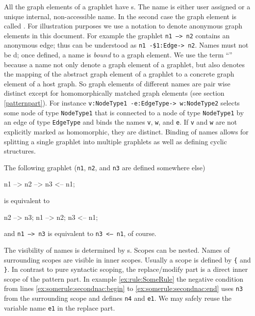 All the graph elements of a graphlet have s.
The name is either user assigned or a unique internal, non-accessible name.
In the second case the graph element is called .
For illustration purposes we use a  notation to denote anonymous graph elements in this document.
For example the graphlet \texttt{n1 --> n2} contains an anonymous edge; thus can be understood as \texttt{n1 -\$1:Edge-> n2}.
Names must not be d; once defined, a name is \emph{bound} to a graph element. 
We use the term ``'' because a name not only denote a graph element of a graphlet, but also denotes the mapping of the abstract graph element of a graphlet to a concrete graph element of a host graph.
So graph elements of different names are pair wise distinct except for homomorphically matched graph elements (see section \ref{patternpart}).
For instance \texttt{v:NodeType1 -e:EdgeType-> w:NodeType2} selects some node of type \texttt{Node\-Type1} that is connected to a node of type \texttt{NodeType1} by an edge of type \texttt{EdgeType} and binds the names \texttt{v}, \texttt{w}, and \texttt{e}. 
If \texttt{v} and \texttt{w} are not explicitly marked as homomorphic, they are distinct.
Binding of names allows for splitting a single graphlet into multiple graphlets as well as defining cyclic structures.
\begin{example}
The following graphlet (\texttt{n1}, \texttt{n2}, and \texttt{n3} are defined somewhere else)
\begin{grgen}
n1 --> n2 --> n3 <-- n1;
\end{grgen}
is equivalent to
\begin{grgen}
n2 --> n3;
n1 --> n2;
n3 <-- n1;
\end{grgen}
and \texttt{n1 --> n3} is equivalent to \texttt{n3 <-- n1}, of course.
\end{example}
The visibility of names is determined by s. 
Scopes can be nested. 
Names of surrounding scopes are visible in inner scopes. 
Usually a scope is defined by \texttt{\{} and \texttt{\}}.
In contrast to pure syntactic scoping, the replace/modify part is a direct inner scope of the pattern part.
In example \ref{ex:rule:SomeRule} the negative condition from lines \ref{ex:somerule:secondnac:begin} to \ref{ex:somerule:secondnac:end} uses \texttt{n3} from the surrounding scope and defines \texttt{n4} and \texttt{e1}. 
We may safely reuse the variable name \texttt{e1} in the replace part.

